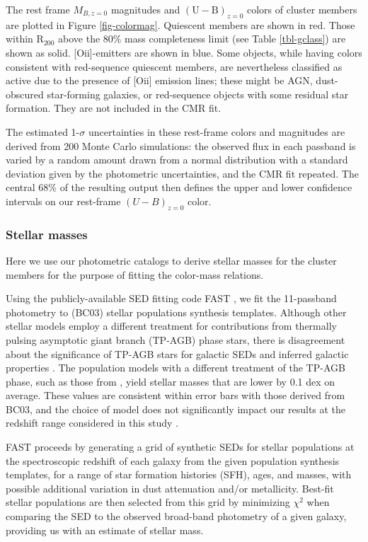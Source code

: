 The rest frame $M_{B,z=0}$ magnitudes and $\mathrm{(U-B)}_{z=0}$ colors of cluster members are plotted in Figure \ref{fig-colormag}. Quiescent members are shown in red. Those within R$_{200}$ above the 80\% mass completeness limit (see Table \ref{tbl-gclass}) are shown as solid. [O{\sc ii}]-emitters are shown in blue. Some objects, while having colors consistent with red-sequence quiescent members, are nevertheless classified as active due to the presence of [O{\sc ii}] emission lines; these might be AGN, dust-obscured star-forming galaxies, or red-sequence objects with some residual star formation. They are not included in the CMR fit.

The estimated 1-$\sigma$ uncertainties in these rest-frame colors and magnitudes are derived from 200 Monte Carlo simulations: the observed flux in each passband is varied by a random amount drawn from a normal distribution with a standard deviation given by the photometric uncertainties, and the CMR fit repeated.
The central 68\% of the resulting output then defines the upper and lower confidence intervals on our rest-frame $(U-B)_{z=0}$ color.

\subsubsection{Stellar masses}\label{sec-stellar_masses}

Here we use our photometric catalogs to derive stellar masses for the cluster members for the purpose of fitting the color-mass relations.

Using the publicly-available SED fitting code FAST \citep{Kriek:2009eq}, we fit the 11-passband photometry to \citet{Bruzual:2003ge} (BC03) stellar populations synthesis templates. Although other stellar models employ a different treatment for contributions from thermally pulsing asymptotic giant branch (TP-AGB) phase stars, there is disagreement about the significance of TP-AGB stars for galactic SEDs and inferred galactic properties \citep{Kriek:2010fq}. The population models with a different treatment of the TP-AGB phase, such as those from \citet{Maraston:2005oj}, yield stellar masses that are lower by 0.1 dex on average. These values are consistent within error bars with those derived from BC03, and the choice of model does not significantly impact our results at the redshift range considered in this study \citep[see e.g.][]{Rettura:2006gb}.

FAST proceeds by generating a grid of synthetic SEDs for stellar populations at the spectroscopic redshift of each galaxy from the given population synthesis templates, for a range of star formation histories (SFH), ages, and masses, with possible additional variation in dust attenuation and/or metallicity. Best-fit stellar populations are then selected from this grid by minimizing ${\chi}^2$ when comparing the SED to the observed broad-band photometry of a given galaxy, providing us with an estimate of stellar mass.


